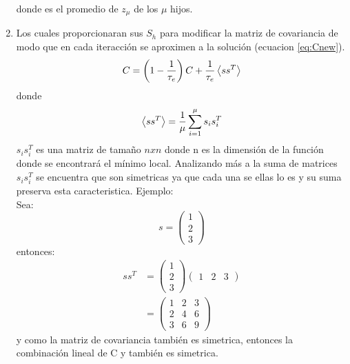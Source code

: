 \begin{enumerate}
        donde  es el promedio de $z_\mu$ de los $\mu$ hijos.
  \item Los cuales proporcionaran sus $S_h$ para modificar la matriz de covariancia de modo que en cada iteracción se aproximen a la solución (ecuacion \ref{eq:Cnew}).
        \begin{equation}
          C= \left(1-\frac{1}{\tau_e} \right) C + \frac{1}{\tau_e} \left\langle ss^T \right\rangle
          \label{eq:Cnew}
        \end{equation}
        donde
        \begin{equation*}
          \left\langle ss^T \right\rangle =\frac{1}{\mu} \sum_{i=1}^\mu s_is_i^T
        \end{equation*}
        $s_is_i^T$ es una matriz de tamaño $nxn$ donde n es la dimensión de la función donde se encontrará el mínimo local. Analizando más a la suma de matrices $s_is_i^T$ se encuentra que son simetricas ya que cada una se ellas lo es y su suma preserva esta caracteristica. Ejemplo:\\
        Sea:
        \begin{equation*}
          s=\begin{pmatrix}
            1 \\ 2 \\ 3
          \end{pmatrix}
        \end{equation*}
        entonces:
        \begin{align*}
          ss^T & = \begin{pmatrix}
            1 \\ 2 \\ 3
          \end{pmatrix}\begin{pmatrix}
            1 & 2 & 3
          \end{pmatrix} \\
               & = \begin{pmatrix}
            1 & 2 & 3 \\
            2 & 4 & 6 \\
            3 & 6 & 9
          \end{pmatrix}
        \end{align*}
        y como la matriz de covariancia también es simetrica, entonces la combinación lineal de C y  también es simetrica.
\end{enumerate}